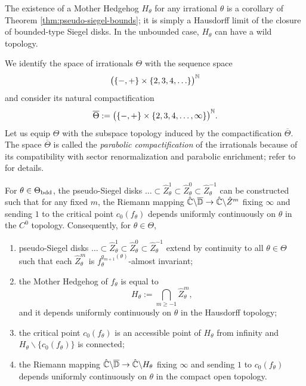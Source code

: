 \documentclass{amsart}
\begin{document}
The existence of a Mother Hedgehog $H_\theta$ for any irrational $\theta$ is a corollary of Theorem \ref{thm:pseudo-siegel-bounds}; it is simply a Hausdorff limit of the closure of bounded-type Siegel disks.
In the unbounded case, $H_\theta$ can have a wild topology.

We identify the space of irrationals $\Theta$ with the sequence space
\[
    \big( \{-,+\} \times \{2,3,4,\ldots \} \big)^{\mathbb{N}}
\]
and consider its natural compactification
\[
    \overline{\Theta} := \big( \{-,+\} \times \{2,3,4,\ldots, \infty\} \big)^{\mathbb{N}}.
\]
Let us equip $\Theta$ with the subspace topology induced by the compactification $\overline{\Theta}$.
The space $\overline{\Theta}$ is called the \emph{parabolic compactification} of the irrationals because of its compatibility with sector renormalization and parabolic enrichment; refer to \cite{Lim26} for details.

\begin{theorem}
\label{thm:uniform-continuity}
    For $\theta \in \Theta_{\textnormal{bdd}}$, the pseudo-Siegel disks $\ldots \subset \hat{Z}^{1}_\theta \subset \hat{Z}^{0}_\theta \subset \hat{Z}^{-1}_\theta$ can be constructed such that for any fixed $m$, 
    the Riemann mapping $\hat{\mathbb{C}} \backslash \overline{\mathbb{D}} \to \hat{\mathbb{C}} \backslash \hat{Z}^m$ fixing $\infty$ and sending $1$ to the critical point $c_0(f_\theta)$ depends uniformly continuously on $\theta$ in the $C^0$ topology. 
    Consequently, for $\theta \in \Theta$, 
    \begin{enumerate}[label=\textnormal{(\arabic*)}]
        \item pseudo-Siegel disks $\ldots \subset \hat{Z}^{1}_\theta \subset \hat{Z}^{0}_\theta \subset \hat{Z}^{-1}_\theta$ extend by continuity to all $\theta \in \Theta$ such that each $\hat{Z}^{m}_\theta$ is $f^{q_{m+1}(\theta)}_\theta$-almost invariant;
        \item the Mother Hedgehog of $f_\theta$ is equal to 
        \[
            H_\theta := \bigcap_{m\geq-1} \hat{Z}^{m}_\theta,
        \]
        and it depends uniformly continuously on $\theta$ in the Hausdorff topology;
        \item the critical point $c_0(f_\theta)$ is an accessible point of $H_\theta$ from infinity and $H_\theta \backslash \{c_0(f_\theta)\}$ is connected;
        \item the Riemann mapping $\hat{\mathbb{C}} \backslash \overline{\mathbb{D}} \to \hat{\mathbb{C}} \backslash H_\theta$ fixing $\infty$ and sending $1$ to $c_0(f_\theta)$ depends uniformly continuously on $\theta$ in the compact open topology.
    \end{enumerate}
\end{theorem}
\end{document}
